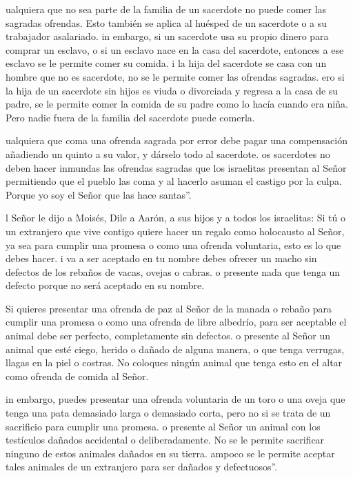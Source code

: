  ualquiera que no sea parte de la familia de un sacerdote
no puede comer las sagradas ofrendas. Esto también se aplica al huésped
de un sacerdote o a su trabajador asalariado.  in embargo,
si un sacerdote usa su propio dinero para comprar un esclavo, o si un
esclavo nace en la casa del sacerdote, entonces a ese esclavo se le
permite comer su comida.  i la hija del sacerdote se casa
con un hombre que no es sacerdote, no se le permite comer las ofrendas
sagradas.  ero si la hija de un sacerdote sin hijos es
viuda o divorciada y regresa a la casa de su padre, se le permite comer
la comida de su padre como lo hacía cuando era niña. Pero nadie fuera de
la familia del sacerdote puede comerla.

 ualquiera que coma una ofrenda sagrada por error debe
pagar una compensación añadiendo un quinto a su valor, y dárselo todo al
sacerdote.  os sacerdotes no deben hacer inmundas las
ofrendas sagradas que los israelitas presentan al Señor 
permitiendo que el pueblo las coma y al hacerlo asuman el castigo por la
culpa. Porque yo soy el Señor que las hace santas''.

 l Señor le dijo a Moisés,  Dile a Aarón, a
sus hijos y a todos los israelitas: Si tú o un extranjero que vive
contigo quiere hacer un regalo como holocausto al Señor, ya sea para
cumplir una promesa o como una ofrenda voluntaria, esto es lo que debes
hacer.  i va a ser aceptado en tu nombre debes ofrecer un
macho sin defectos de los rebaños de vacas, ovejas o cabras.
 o presente nada que tenga un defecto porque no será
aceptado en su nombre.

 Si quieres presentar una ofrenda de paz al Señor de la
manada o rebaño para cumplir una promesa o como una ofrenda de libre
albedrío, para ser aceptable el animal debe ser perfecto, completamente
sin defectos.  o presente al Señor un animal que esté
ciego, herido o dañado de alguna manera, o que tenga verrugas, llagas en
la piel o costras. No coloques ningún animal que tenga esto en el altar
como ofrenda de comida al Señor.

 in embargo, puedes presentar una ofrenda voluntaria de un
toro o una oveja que tenga una pata demasiado larga o demasiado corta,
pero no si se trata de un sacrificio para cumplir una promesa.
 o presente al Señor un animal con los testículos dañados
accidental o deliberadamente. No se le permite sacrificar ninguno de
estos animales dañados en su tierra.  ampoco se le permite
aceptar tales animales de un extranjero para ser dañados y
defectuosos''.

